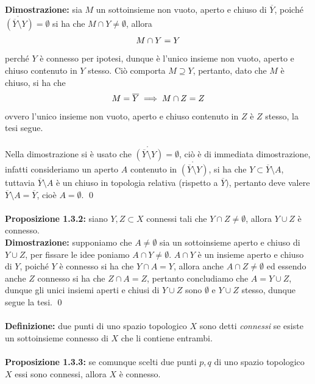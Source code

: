 \documentclass{article}
\begin{document}
\textbf{Dimostrazione:} sia $M$ un sottoinsieme non vuoto, aperto e chiuso di $\overline{Y}$, poiché $\mathring{(\overline{Y} \setminus Y)} = \emptyset$ si ha che $M \cap Y \neq \emptyset$, allora
\begin{gather}
    M \cap Y = Y \notag
\end{gather}
perché $Y$ è connesso per ipotesi, dunque è l'unico insieme non vuoto, aperto e chiuso contenuto in $Y$ stesso. Ciò comporta $M \supseteq Y$, pertanto, dato che $M$ è chiuso, si ha che
\begin{gather}
    M = \overline{Y} \implies M \cap Z = Z \notag
\end{gather}
ovvero l'unico insieme non vuoto, aperto e chiuso contenuto in $Z$ è $Z$ stesso, la tesi segue. \\ \\
Nella dimostrazione si è usato che $\mathring{(\overline{Y} \setminus Y)} = \emptyset$, ciò è di immediata dimostrazione, infatti consideriamo un aperto $A$ contenuto in $\mathring{(\overline{Y} \setminus Y)}$, si ha che $Y \subset \overline{Y} \setminus A$, tuttavia $\overline{Y} \setminus A$ è un chiuso in topologia relativa (rispetto a $\overline{Y})$, pertanto deve valere $\overline{Y} \setminus A = \overline{Y}$, cioè $A = \emptyset$. \qed \\ \\
\textbf{Proposizione 1.3.2:} siano $Y, Z \subset X$ connessi tali che $Y \cap Z \neq \emptyset$, allora $Y \cup Z$ è connesso. \\

\textbf{Dimostrazione:} supponiamo che $A \neq \emptyset$ sia un sottoinsieme aperto e chiuso di $Y \cup Z$, per fissare le idee poniamo $A \cap Y \neq \emptyset$. $A \cap Y$ è un insieme aperto e chiuso di $Y$, poiché $Y$ è connesso si ha che $Y \cap A = Y$, allora anche $A \cap Z \neq \emptyset$ ed essendo anche $Z$ connesso si ha che $Z \cap A = Z$, pertanto concludiamo che $A = Y \cup Z$, dunque gli unici insiemi aperti e chiusi di $Y \cup Z$ sono $\emptyset$ e $Y \cup Z$ stesso, dunque segue la tesi. \qed \\ \\
\textbf{Definizione:} due punti di uno spazio topologico $X$ sono detti \textit{connessi} se esiste un sottoinsieme connesso di $X$ che li contiene entrambi. \\ \\
\textbf{Proposizione 1.3.3:} se comunque scelti due punti $p, q$ di uno spazio topologico $X$ essi sono connessi, allora $X$ è connesso. \\
\end{document}

